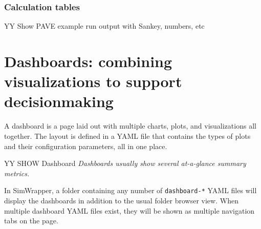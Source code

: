 \hypertarget{calculation-tables}{%
\subsubsection{Calculation tables}\label{calculation-tables}}

YY Show PAVE example run output with Sankey, numbers, etc

\hypertarget{dashboards-combining-visualizations-to-support-decisionmaking}{%
\section{Dashboards: combining visualizations to support
decisionmaking}\label{dashboards-combining-visualizations-to-support-decisionmaking}}

A dashboard is a page laid out with multiple charts, plots, and
visualizations all together. The layout is defined in a YAML file that
contains the types of plots and their configuration parameters, all in
one place.

YY SHOW Dashboard \emph{Dashboards usually show several at-a-glance
summary metrics.}

In SimWrapper, a folder containing any number of \texttt{dashboard-*}
YAML files will display the dashboards in addition to the usual folder
browser view. When multiple dashboard YAML files exist, they will be
shown as multiple navigation tabs on the page.

